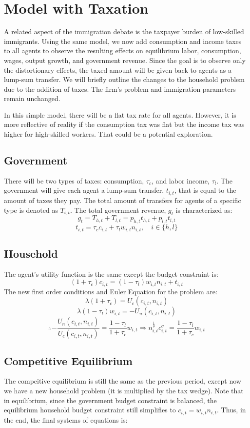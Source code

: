 \documentclass[11pt]{article}
\begin{document}
\section{Model with Taxation}

A related aspect of the immigration debate is the taxpayer burden of low-skilled immigrants. Using the same model, we now add consumption and income taxes to all agents to observe the resulting effects on equilibrium labor, consumption, wages, output growth, and government revenue. Since the goal is to observe only the distortionary effects, the taxed amount will be given back to agents as a lump-sum transfer. We will briefly outline the changes to the household problem due to the addition of taxes. The firm's problem and immigration parameters remain unchanged.

In this simple model, there will be a flat tax rate for all agents. However, it is more reflective of reality if the consumption tax was flat but the income tax was higher for high-skilled workers. That could be a potential exploration.

  \subsection{Government}
  There will be two types of taxes: consumption, $\tau_c$, and labor income, $\tau_l$. The government will give each agent a lump-sum transfer, $t_{i,t}$, that is equal to the amount of taxes they pay. The total amount of transfers for agents of a specific type is denoted as $T_{i,t}$. The total government revenue, $g_t$ is characterized as:
  $$ g_t = T_{h,t}+T_{l,t} = p_{h,t} t_{h,t} + p_{l,t}t_{l,t}$$
  $$ t_{i,t} = \tau_c c_{i,t}+ \tau_l w_{i,t} n_{i,t}, \quad i\in\{h,l\}$$

  \subsection{Household}
  The agent's utility function is the same except the budget constraint is:
  $$ (1+\tau_c)c_{i,t} = (1-\tau_l)w_{i,t} n_{i,t}+t_{i,t}$$
  The new first order conditions and Euler Equation for the problem are:
  $$ \lambda (1+\tau_c) = U_c(c_{i,t},n_{i,t})$$
  $$ \lambda (1-\tau_l) w_{i,t} = - U_n(c_{i,t},n_{i,t})$$
  $$\therefore -\frac{U_n(c_{i,t}, n_{i,t})}{U_c(c_{i,t}, n_{i,t})} =\frac{1-\tau_l}{1+\tau_c} w_{i,t} \Rightarrow  n_{i,t}^{\frac{1}{\theta}} c_{i,t}^\sigma= \frac{1-\tau_l}{1+\tau_c} w_{i,t}$$

  \subsection{Competitive Equilibrium}
  The compeitive equilibrium is still the same as the previous period, except now we have a new household problem (it is multiplied by the tax wedge). Note that in equilibrium, since the government budget constraint is balanced, the equilibrium household budget constraint still simplifies to $c_{i,t} = w_{i,t} n_{i,t}$. Thus, in the end, the final systems of equations is:
\end{document}
